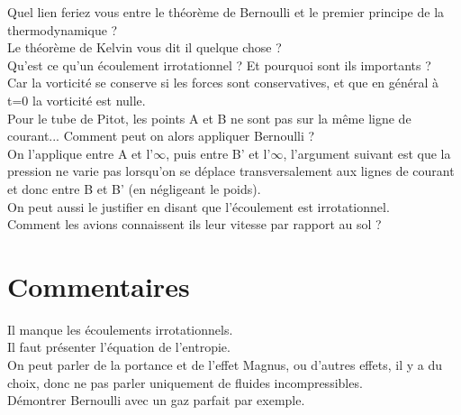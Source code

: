 \documentclass[12pt,prb,aps,epsf]{article}
\begin{document}
Quel lien feriez vous entre le théorème de Bernoulli et le premier principe de la thermodynamique ?\\

Le théorème de Kelvin vous dit il quelque chose ?\\

Qu'est ce qu'un écoulement irrotationnel ? Et pourquoi sont ils importants ?\\
Car la vorticité se conserve si les forces sont conservatives, et que en général à t=0 la vorticité est nulle.\\

Pour le tube de Pitot, les points A et B ne sont pas sur la même ligne de courant... Comment peut on alors appliquer Bernoulli ?\\
On l'applique entre A et l'$\infty$, puis entre B' et l'$\infty$, l'argument suivant est que la pression ne varie pas lorsqu'on se déplace transversalement aux lignes de courant et donc entre B et B' (en négligeant le poids).\\
On peut aussi le justifier en disant que l'écoulement est irrotationnel.\\

Comment les avions connaissent ils leur vitesse par rapport au sol ?

\section*{Commentaires}
Il manque les écoulements irrotationnels.\\
Il faut présenter l'équation de l'entropie.\\
On peut parler de la portance et de l'effet Magnus, ou d'autres effets, il y a du choix, donc ne pas parler uniquement de fluides incompressibles.\\
Démontrer Bernoulli avec un gaz parfait par exemple.
\end{document}
